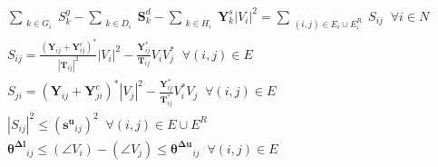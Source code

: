 \begin{align}
& \sum_{\substack{k \in G_i}} S^g_k - \sum_{\substack{k \in D_i}} \bm S^d_k - \sum_{\substack{k \in H_i}} \bm Y^s_k |V_i|^2 = \sum_{\substack{(i,j)\in E_i \cup E_i^R}} S_{ij} \;\; \forall i \in N \\ 
& S_{ij} = \frac{\left( \bm Y_{ij} + \bm Y^c_{ij} \right)^*}{|\bm{T}_{ij}|^2} |V_i|^2 - \frac{\bm Y^*_{ij}}{\bm{T}_{ij}} V_i V^*_j \;\; \forall (i,j)\in E \\
& S_{ji} = \left( \bm Y_{ij} + \bm Y^c_{ji}  \right)^* |V_j|^2 - \frac{\bm Y^*_{ij}}{\bm{T}^*_{ij}} V^*_i V_j \;\; \forall (i,j)\in E \\
& |S_{ij}|^2 \leq (\bm {s^u}_{ij})^2 \;\; \forall (i,j) \in E \cup E^R \\
& \bm {\theta^{\Delta l}}_{ij} \leq (\angle V_i) - (\angle V_j) \leq \bm {\theta^{\Delta u}}_{ij} \;\; \forall (i,j) \in E
%
\end{align}